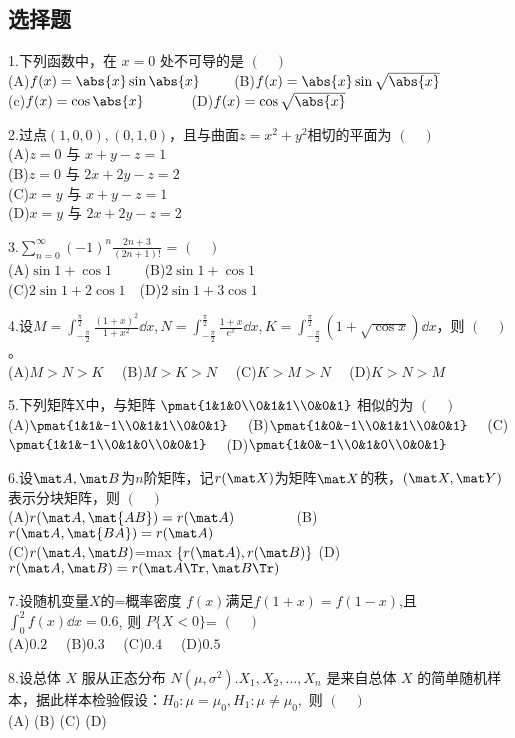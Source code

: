 
\subsection{选择题}
1.下列函数中，在 $x=0$ 处不可导的是 $(\quad)$\\
(A)$f(x)=\abs{x} \sin \abs{x} \qquad$  (B)$f(x)=\abs{x} \sin \sqrt{\abs{x}}$\\
(c)$f(x)=\cos \abs{x} \qquad \quad$  (D)$ f(x)=\cos \sqrt{\abs{x}}$

2.过点$(1,0,0),(0,1,0)$，且与曲面$z=x^2+y^2$相切的平面为 $(\quad)$\\
(A)$z=0$ 与 $x+y-z=1$\\
(B)$z=0$ 与 $2x+2y-z=2$\\
(C)$x=y$ 与 $x+y-z=1$\\
(D)$x=y$ 与 $2x+2y-z=2$

3.$\displaystyle \sum_{n=0}^\infty (-1)^n \frac{2n+3}{(2n+1)!}$ = $(\quad)$ \\
(A)$\sin 1+\cos 1 \qquad$  (B)$2\sin 1+\cos 1$ \\
(C)$2\sin 1+2\cos 1  \quad$(D)$2\sin 1+3\cos 1$

4.设$\displaystyle M=\int_{-\frac{\pi}{2}}^\frac{\pi}{2}\frac{(1+x)^2}{1+x^2}\dd{x},N=\int_{-\frac{\pi}{2}}^\frac{\pi}{2}\frac{1+x}{e^x}\dd{x},K=\int_{-\frac{\pi}{2}}^\frac{\pi}{2}(1+\sqrt{\cos x})\dd{x}$，则 $(\quad)$ 。\\
(A)$M>N>K \quad$ (B)$M>K>N \quad$ (C)$K>M>N \quad$ (D)$K>N>M$

5.下列矩阵X中，与矩阵 $\pmat{1&1&0\\0&1&1\\0&0&1}$ 相似的为 $(\quad)$\\
(A)$\pmat{1&1&-1\\0&1&1\\0&0&1} \quad$
(B)$\pmat{1&0&-1\\0&1&1\\0&0&1} \quad$
(C)$\pmat{1&1&-1\\0&1&0\\0&0&1} \quad$
(D)$\pmat{1&0&-1\\0&1&0\\0&0&1}$

6.设$\mat A,\mat B$为$n$阶矩阵，记$r(\mat X)$为矩阵$\mat X$的秩，$(\mat X,\mat Y)$表示分块矩阵，则 $(\quad)$ \\
(A)$r(\mat A,\mat {AB})=r(\mat A) \qquad \qquad$
(B)$r(\mat A,\mat {BA})=r(\mat A) \quad$\\
(C)$r(\mat A,\mat B)$=max $ \{r(\mat A),r(\mat B)\}$
(D)$r(\mat A,\mat B)=r(\mat A \Tr,\mat B \Tr)$

7.设随机变量$X$的=概率密度 $f(x)$满足$f(1+x)=f(1-x)$,且 $\int_0^2 f(x)\dd{x}=0.6$, 则 $P\{X<0\}$= $(\quad)$\\
(A)$0.2 \quad$
(B)$0.3 \quad$
(C)$0.4 \quad$
(D)$0.5 \quad$


8.设总体 $X$ 服从正态分布 $N(\mu,\sigma^2).X_1,X_2,\dots,X_n$ 是来自总体 $X$ 的简单随机样本，据此样本检验假设：$H_0:\mu=\mu_0,H_1:\mu\neq \mu_0,$
则 $(\quad)$\\
(A)
(B)
(C)
(D)